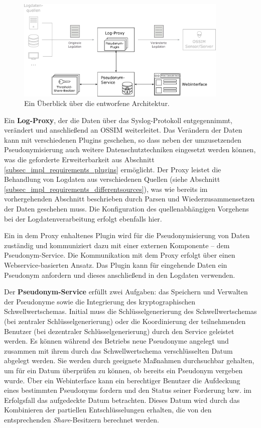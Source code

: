 \begin{figure}[]
    \centering
        \includegraphics[width=0.9\textwidth]{dia/high_level_architecture.pdf}
    \caption{Ein Überblick über die entworfene Architektur.}
    \label{fig:high__level_architecture}
\end{figure}

Ein \textbf{Log-Proxy}, der die Daten über das Syslog-Protokoll entgegennimmt, verändert und anschließend an OSSIM weiterleitet. Das Verändern der Daten kann mit verschiedenen Plugins geschehen, so dass neben der umzusetzenden Pseudonymisierung auch weitere Datenschutztechniken eingesetzt werden können, was die geforderte Erweiterbarkeit aus Abschnitt \ref{subsec_impl_requirements_plugins} ermöglicht. Der Proxy leistet die Behandlung von Logdaten aus verschiedenen Quellen (siehe Abschnitt \ref{subsec_impl_requirements_differentsources}), was wie bereits im vorhergehenden Abschnitt beschrieben durch Parsen und Wiederzusammensetzen der Daten geschehen muss. Die Konfiguration des quellenabhängigen Vorgehens bei der Logdatenverarbeitung erfolgt ebenfalls hier.

Ein in dem Proxy enhaltenes Plugin wird für die Pseudonymisierung von Daten zuständig und kommuniziert dazu mit einer externen Komponente -- dem Pseudonym-Service. Die Kommunikation mit dem Proxy erfolgt über einen Webservice-basierten Ansatz. Das Plugin kann für eingehende Daten ein Pseudonym anfordern und dieses anschließend in den Logdaten verwenden.

Der \textbf{Pseudonym-Service} erfüllt zwei Aufgaben: das Speichern und Verwalten der Pseudonyme sowie die Integrierung des kryptographischen Schwellwertschemas. Initial muss die Schlüsselgenerierung des Schwellwertschemas (bei zentraler Schlüsselgenerierung) oder die Koordinierung der teilnehmenden Benutzer (bei dezentraler Schlüsselgenerierung) durch den Service geleistet werden. 
Es können während des Betriebs neue Pseudonyme angelegt und zusammen mit ihrem durch das Schwellwertschema verschlüsselten Datum abgelegt werden. Sie werden durch geeignete Maßnahmen durchsuchbar gehalten, um für ein Datum überprüfen zu können, ob bereits ein Pseudonym vergeben wurde. 
Über ein Webinterface kann ein berechtiger Benutzer die Aufdeckung eines bestimmten Pseudonyms fordern und den Status seiner Forderung bzw. im Erfolgsfall das aufgedeckte Datum betrachten. Dieses Datum wird durch das Kombinieren der partiellen Entschlüsselungen erhalten, die von den entsprechenden \textit{Share}-Besitzern berechnet werden.

